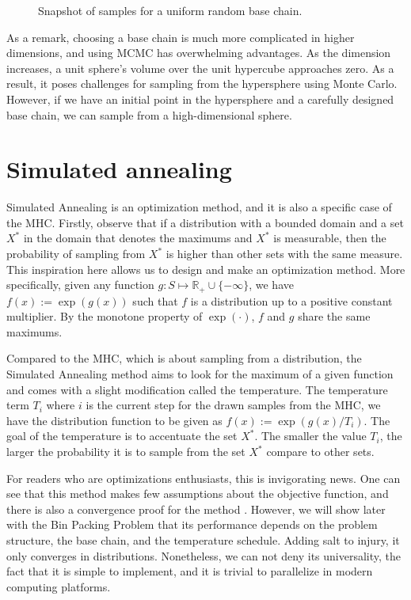 \documentclass[]{article}
\theoremstyle{definition}
\begin{document}
\begin{figure}[H]
\begin{subfigure}{0.3\textwidth}
            \end{subfigure}
            \caption{Snapshot of samples for a uniform random base chain.}
            \label{fig:unif_rand_bc}
        \end{figure}
        As a remark, choosing a base chain is much more complicated in higher dimensions, and using MCMC has overwhelming advantages. As the dimension increases, a unit sphere's volume over the unit hypercube approaches zero. As a result, it poses challenges for sampling from the hypersphere using Monte Carlo. However, if we have an initial point in the hypersphere and a carefully designed base chain, we can sample from a high-dimensional sphere. 

\section{Simulated annealing}
    Simulated Annealing is an optimization method, and it is also a specific case of the MHC. Firstly, observe that if a distribution with a bounded domain and a set $X^*$ in the domain that denotes the maximums and $X^*$ is measurable, then the probability of sampling from $X^*$ is higher than other sets with the same measure. This inspiration here allows us to design and make an optimization method. More specifically, given any function $g:S \mapsto \mathbb R_+ \cup \{-\infty\}$, we have $f(x):= \exp(g(x))$ such that $f$ is a distribution up to a positive constant multiplier. By the monotone property of $\exp(\cdot)$, $f$ and $g$ share the same maximums. 
    \par
    Compared to the MHC, which is about sampling from a distribution, the Simulated Annealing method aims to look for the maximum of a given function and comes with a slight modification called the temperature. The temperature term $T_i$ where $i$ is the current step for the drawn samples from the MHC, we have the distribution function to be given as $f(x):= \exp(g(x)/T_i)$. The goal of the temperature is to accentuate the set $X^*$. The smaller the value $T_i$, the larger the probability it is to sample from the set $X^*$ compare to other sets. 
    \par
    For readers who are optimizations enthusiasts, this is invigorating news. One can see that this method makes few assumptions about the objective function, and there is also a convergence proof for the method \cite{article:sim_anneal_1994}. However, we will show later with the Bin Packing Problem that its performance depends on the problem structure, the base chain, and the temperature schedule. Adding salt to injury, it only converges in distributions. Nonetheless, we can not deny its universality, the fact that it is simple to implement, and it is trivial to parallelize in modern computing platforms. 
\end{document}
